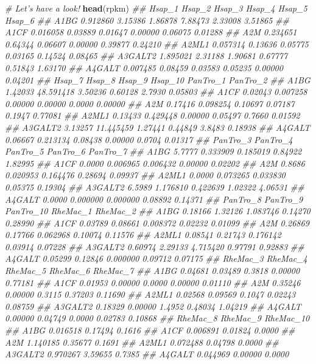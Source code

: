 \documentclass[]{book}
\newenvironment{Shaded}{\begin{snugshade}}{\end{snugshade}}
\newcommand{\CommentTok}[1]{\textcolor[rgb]{0.56,0.35,0.01}{\textit{#1}}}
\newcommand{\KeywordTok}[1]{\textcolor[rgb]{0.13,0.29,0.53}{\textbf{#1}}}
\newcommand{\NormalTok}[1]{#1}
\begin{document}
\begin{Shaded}
\begin{Highlighting}[]
\CommentTok{# Let's have a look!}
\KeywordTok{head}\NormalTok{(rpkm)}
\CommentTok{##           Hsap_1  Hsap_2  Hsap_3  Hsap_4  Hsap_5  Hsap_6}
\CommentTok{## A1BG    0.912860 3.15386 1.86878 7.88473 2.33008 3.51865}
\CommentTok{## A1CF    0.016058 0.03889 0.01647 0.00000 0.06075 0.01288}
\CommentTok{## A2M     0.234651 0.64344 0.06607 0.00000 0.39877 0.24210}
\CommentTok{## A2ML1   0.057314 0.13636 0.05775 0.03165 0.14524 0.08465}
\CommentTok{## A3GALT2 1.895021 2.31188 1.90681 0.67777 0.51843 1.63170}
\CommentTok{## A4GALT  0.007485 0.08459 0.03583 0.05235 0.00000 0.04201}
\CommentTok{##          Hsap_7    Hsap_8  Hsap_9 Hsap_10 PanTro_1 PanTro_2}
\CommentTok{## A1BG    1.42033 48.591418 3.50236 0.60128   2.7930  0.05803}
\CommentTok{## A1CF    0.02043  0.007258 0.00000 0.00000   0.0000  0.00000}
\CommentTok{## A2M     0.17416  0.098254 0.10697 0.07187   0.1947  0.77081}
\CommentTok{## A2ML1   0.13433  0.429448 0.00000 0.05497   0.7660  0.01592}
\CommentTok{## A3GALT2 3.13257 11.445459 1.27441 0.44849   3.8483  0.18938}
\CommentTok{## A4GALT  0.06667  0.213134 0.08438 0.00000   0.0704  0.01317}
\CommentTok{##         PanTro_3 PanTro_4 PanTro_5 PanTro_6 PanTro_7}
\CommentTok{## A1BG      5.7777 0.333909 0.185019  0.84922  1.82995}
\CommentTok{## A1CF      0.0000 0.006965 0.006432  0.00000  0.02202}
\CommentTok{## A2M       0.8686 0.020953 0.164476  0.28694  0.09937}
\CommentTok{## A2ML1     0.0000 0.073265 0.033830  0.05375  0.19304}
\CommentTok{## A3GALT2   6.5989 1.176810 0.422639  1.02322  4.06531}
\CommentTok{## A4GALT    0.0000 0.000000 0.000000  0.08892  0.14371}
\CommentTok{##         PanTro_8 PanTro_9 PanTro_10 RheMac_1 RheMac_2}
\CommentTok{## A1BG     0.18166  1.32126  1.083746  0.14270  0.28990}
\CommentTok{## A1CF     0.03789  0.08661  0.008372  0.02232  0.01099}
\CommentTok{## A2M      0.26869  0.17766  0.062968  0.10074  0.11576}
\CommentTok{## A2ML1    0.08541  0.21743  0.176142  0.03914  0.07228}
\CommentTok{## A3GALT2  0.60974  2.29133  4.715420  0.97791  0.92883}
\CommentTok{## A4GALT   0.05299  0.12846  0.000000  0.09712  0.07175}
\CommentTok{##         RheMac_3 RheMac_4 RheMac_5 RheMac_6 RheMac_7}
\CommentTok{## A1BG     0.04681  0.03489   0.3818  0.00000  0.77181}
\CommentTok{## A1CF     0.01953  0.00000   0.0000  0.00000  0.01110}
\CommentTok{## A2M      0.35246  0.00000   0.3115  0.37203  0.11690}
\CommentTok{## A2ML1    0.02568  0.09569   0.1047  0.02243  0.08759}
\CommentTok{## A3GALT2  0.18329  0.00000   1.4952  0.48034  1.04219}
\CommentTok{## A4GALT   0.00000  0.04749   0.0000  0.02783  0.10868}
\CommentTok{##         RheMac_8 RheMac_9 RheMac_10}
\CommentTok{## A1BG    0.016518  0.17494    0.1616}
\CommentTok{## A1CF    0.006891  0.01824    0.0000}
\CommentTok{## A2M     1.140185  0.35677    0.1691}
\CommentTok{## A2ML1   0.072488  0.04798    0.0000}
\CommentTok{## A3GALT2 0.970267  3.59655    0.7385}
\CommentTok{## A4GALT  0.044969  0.00000    0.0000}


\end{Highlighting}
\end{Shaded}
\end{document}
